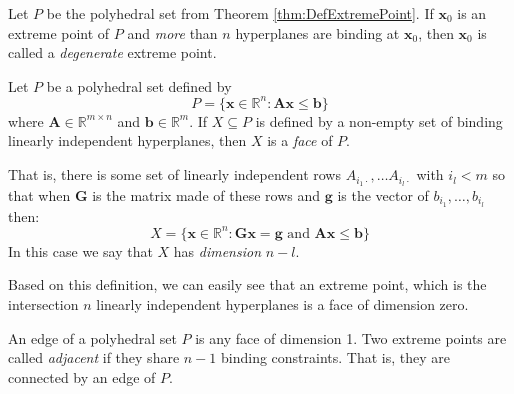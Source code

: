 \begin{definition} Let $P$ be the polyhedral set from Theorem \ref{thm:DefExtremePoint}. If $\mathbf{x}_0$ is an extreme point of $P$ and \textit{more} than $n$ hyperplanes are binding at $\mathbf{x}_0$, then $\mathbf{x}_0$ is called a \textit{degenerate} extreme point.
\end{definition}

\begin{definition}[Face] Let $P$ be a polyhedral set defined by
\begin{displaymath}
P = \{\mathbf{x} \in \mathbb{R}^n : \mathbf{A}\mathbf{x} \leq \mathbf{b}\}
\end{displaymath}
where $\mathbf{A} \in \mathbb{R}^{m\times n}$ and $\mathbf{b} \in \mathbb{R}^m$. If $X \subseteq P$ is defined by a non-empty set of binding linearly independent hyperplanes, then $X$ is a \textit{face} of $P$. 

That is, there is some set of linearly independent rows $A_{i_1\cdot},\dots A_{i_l\cdot}$ with $i_l < m$ so that when $\mathbf{G}$ is the matrix made of these rows and $\mathbf{g}$ is the vector of $b_{i_1},\dots,b_{i_l}$ then: 
\begin{equation}
X = \{\mathbf{x} \in \mathbb{R}^n : \mathbf{G}\mathbf{x} = \mathbf{g} \text{ and } \mathbf{A}\mathbf{x} \leq \mathbf{b}\}
\end{equation}
In this case we say that $X$ has \textit{dimension} $n - l$. 
\end{definition}

\begin{remark} Based on this definition, we can easily see that an extreme point, which is the intersection $n$ linearly independent hyperplanes is a face of dimension zero. 
\end{remark}

\begin{definition} An edge of a polyhedral set $P$ is any face of dimension 1. Two extreme points are called \textit{adjacent} if they share $n-1$ binding constraints. That is, they are connected by an edge of $P$.
\end{definition} 


